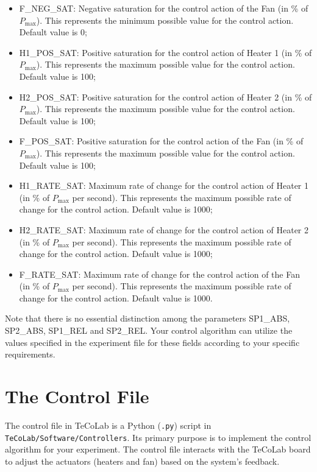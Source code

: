 \documentclass[12pt]{report}
\begin{document}
\begin{itemize}
\item F\_NEG\_SAT: Negative saturation for the control action of the Fan (in \% of $P_{\text{max}}$). This represents the minimum possible value for the control action. Default value is 0;
\item H1\_POS\_SAT: Positive saturation for the control action of Heater 1 (in \% of $P_{\text{max}}$). This represents the maximum possible value for the control action. Default value is 100;
\item H2\_POS\_SAT: Positive saturation for the control action of Heater 2 (in \% of $P_{\text{max}}$). This represents the maximum possible value for the control action. Default value is 100;
\item F\_POS\_SAT: Positive saturation for the control action of the Fan (in \% of $P_{\text{max}}$). This represents the maximum possible value for the control action. Default value is 100;
\item H1\_RATE\_SAT: Maximum rate of change for the control action of Heater 1 (in \% of $P_{\text{max}}$ per second). This represents the maximum possible rate of change for the control action. Default value is 1000;
\item H2\_RATE\_SAT: Maximum rate of change for the control action of Heater 2 (in \% of $P_{\text{max}}$ per second). This represents the maximum possible rate of change for the control action. Default value is 1000;
\item F\_RATE\_SAT: Maximum rate of change for the control action of the Fan (in \% of $P_{\text{max}}$ per second). This represents the maximum possible rate of change for the control action. Default value is 1000.
\end{itemize}

Note that there is no essential distinction among the parameters SP1\_ABS, SP2\_ABS, SP1\_REL and SP2\_REL. Your control algorithm can utilize the values specified in the experiment file for these fields according to your specific requirements.

\section{The Control File}\label{sec:ControlFile}

The control file in TeCoLab is a Python (\texttt{.py}) script in \texttt{TeCoLab/Software/Controllers}. Its primary purpose is to implement the control algorithm for your experiment. The control file interacts with the TeCoLab board to adjust the actuators (heaters and fan) based on the system's feedback.
\end{document}
